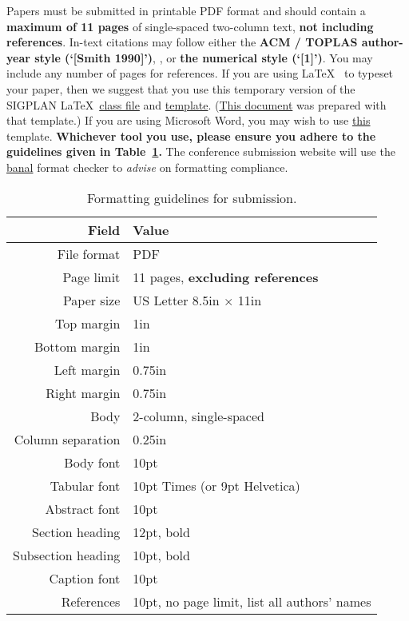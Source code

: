 \documentclass[pldi]{sigplanconf-pldi15}
\begin{document}
Papers must be submitted in printable PDF format and should contain a
\textbf{maximum of 11 pages} of single-spaced two-column text,
\textbf{not including references}.  In-text citations may follow either the
\textbf{ACM / TOPLAS author-year style (`[Smith 1990]')}, 
, or \textbf{the numerical style (`[1]')}.  You may include any number of pages for
references.  If you are using
\LaTeX~\cite{Lamport:94} to typeset your paper, then we suggest that
you use this temporary version of the SIGPLAN 
\LaTeX~\href{http://conf.researchr.org/getImage/pldi2015/orig/sigplanconf-pldi15.cls}{class
  file} and
\href{http://conf.researchr.org/getImage/pldi2015/orig/pldi15-template.tex}{template}.
(\href{http://conf.researchr.org/getImage/pldi2015/orig/pldi15-template.pdf}{This
  document} was prepared with that template.)  If you are using
Microsoft Word, you may wish to use
\href{http://conf.researchr.org/getImage/pldi2015/orig/pldi15-word-template.dot}{this}
template.  \textbf{Whichever tool you use, please ensure you adhere to the
guidelines given in Table~\ref{table:formatting}.}  The conference
submission website will use the
\href{https://www.usenix.org/legacy/event/wowcs08/tech/full_papers/voelker/voelker.pdf}{banal}
format checker to \emph{advise} on formatting compliance.

\begin{table}[t!]
  \centering
{  \sffamily\small %
  \begin{tabular}{rl}
    \textbf{Field} & \textbf{Value}\\
    \hline
    File format & PDF \\
    Page limit & 11 pages, \textbf{excluding references}\\
    Paper size & US Letter 8.5in $\times$ 11in\\
    Top margin & 1in\\
    Bottom margin & 1in\\
    Left margin & 0.75in\\
    Right margin & 0.75in\\
    Body & 2-column, single-spaced\\
    Column separation & 0.25in\\
    Body font & 10pt\\
    Tabular font & 10pt Times (or 9pt Helvetica)\\
    Abstract font & 10pt\\
    Section heading  & 12pt, bold\\
    Subsection heading  & 10pt, bold\\
    Caption font & 10pt\\
    References & 10pt, no page limit, list all authors' names\\
  \end{tabular}
}
  \caption{Formatting guidelines for submission. }
  \label{table:formatting}
\end{table}
\end{document}
